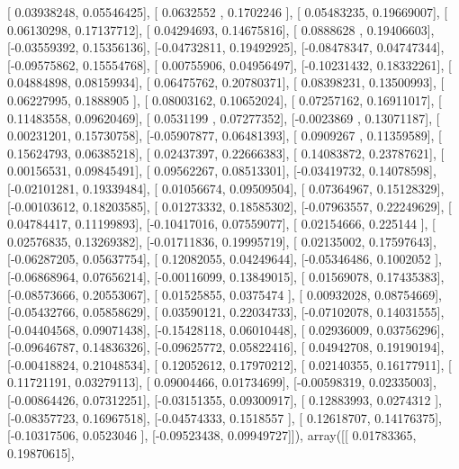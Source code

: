 \documentclass{article}
\begin{document}
       [ 0.03938248,  0.05546425],
       [ 0.0632552 ,  0.1702246 ],
       [ 0.05483235,  0.19669007],
       [ 0.06130298,  0.17137712],
       [ 0.04294693,  0.14675816],
       [ 0.0888628 ,  0.19406603],
       [-0.03559392,  0.15356136],
       [-0.04732811,  0.19492925],
       [-0.08478347,  0.04747344],
       [-0.09575862,  0.15554768],
       [ 0.00755906,  0.04956497],
       [-0.10231432,  0.18332261],
       [ 0.04884898,  0.08159934],
       [ 0.06475762,  0.20780371],
       [ 0.08398231,  0.13500993],
       [ 0.06227995,  0.1888905 ],
       [ 0.08003162,  0.10652024],
       [ 0.07257162,  0.16911017],
       [ 0.11483558,  0.09620469],
       [ 0.0531199 ,  0.07277352],
       [-0.0023869 ,  0.13071187],
       [ 0.00231201,  0.15730758],
       [-0.05907877,  0.06481393],
       [ 0.0909267 ,  0.11359589],
       [ 0.15624793,  0.06385218],
       [ 0.02437397,  0.22666383],
       [ 0.14083872,  0.23787621],
       [ 0.00156531,  0.09845491],
       [ 0.09562267,  0.08513301],
       [-0.03419732,  0.14078598],
       [-0.02101281,  0.19339484],
       [ 0.01056674,  0.09509504],
       [ 0.07364967,  0.15128329],
       [-0.00103612,  0.18203585],
       [ 0.01273332,  0.18585302],
       [-0.07963557,  0.22249629],
       [ 0.04784417,  0.11199893],
       [-0.10417016,  0.07559077],
       [ 0.02154666,  0.225144  ],
       [ 0.02576835,  0.13269382],
       [-0.01711836,  0.19995719],
       [ 0.02135002,  0.17597643],
       [-0.06287205,  0.05637754],
       [ 0.12082055,  0.04249644],
       [-0.05346486,  0.1002052 ],
       [-0.06868964,  0.07656214],
       [-0.00116099,  0.13849015],
       [ 0.01569078,  0.17435383],
       [-0.08573666,  0.20553067],
       [ 0.01525855,  0.0375474 ],
       [ 0.00932028,  0.08754669],
       [-0.05432766,  0.05858629],
       [ 0.03590121,  0.22034733],
       [-0.07102078,  0.14031555],
       [-0.04404568,  0.09071438],
       [-0.15428118,  0.06010448],
       [ 0.02936009,  0.03756296],
       [-0.09646787,  0.14836326],
       [-0.09625772,  0.05822416],
       [ 0.04942708,  0.19190194],
       [-0.00418824,  0.21048534],
       [ 0.12052612,  0.17970212],
       [ 0.02140355,  0.16177911],
       [ 0.11721191,  0.03279113],
       [ 0.09004466,  0.01734699],
       [-0.00598319,  0.02335003],
       [-0.00864426,  0.07312251],
       [-0.03151355,  0.09300917],
       [ 0.12883993,  0.0274312 ],
       [-0.08357723,  0.16967518],
       [-0.04574333,  0.1518557 ],
       [ 0.12618707,  0.14176375],
       [-0.10317506,  0.0523046 ],
       [-0.09523438,  0.09949727]]), array([[ 0.01783365,  0.19870615],
\end{document}
